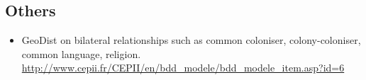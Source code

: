 \documentclass[10pt]{article} %
\begin{document}
    \subsection{Others}
        \begin{itemize}
            \item GeoDist on bilateral relationships such as common coloniser, colony-coloniser, common language, religion. \url{http://www.cepii.fr/CEPII/en/bdd_modele/bdd_modele_item.asp?id=6}
        \end{itemize}

\newpage

\footnotesize


\end{document}
